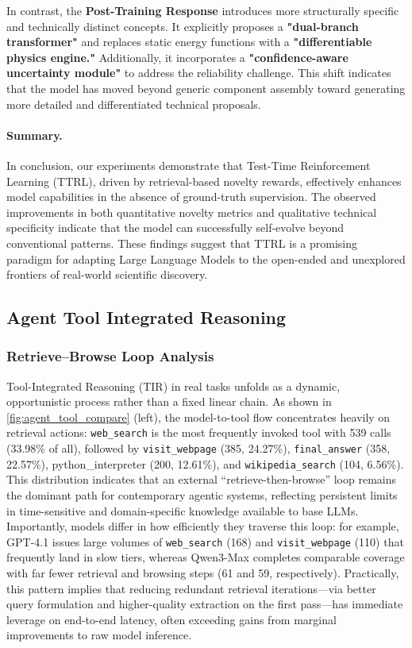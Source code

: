 In contrast, the \textbf{Post-Training Response} introduces more structurally specific and technically distinct concepts. It explicitly proposes a \textbf{"dual-branch transformer"} and replaces static energy functions with a \textbf{"differentiable physics engine."} Additionally, it incorporates a \textbf{"confidence-aware uncertainty module"} to address the reliability challenge. This shift indicates that the model has moved beyond generic component assembly toward generating more detailed and differentiated technical proposals.

\paragraph{Summary.}
In conclusion, our experiments demonstrate that Test-Time Reinforcement Learning (TTRL), driven by retrieval-based novelty rewards, effectively enhances model capabilities in the absence of ground-truth supervision. The observed improvements in both quantitative novelty metrics and qualitative technical specificity indicate that the model can successfully self-evolve beyond conventional patterns. These findings suggest that TTRL is a promising paradigm for adapting Large Language Models to the open-ended and unexplored frontiers of real-world scientific discovery.

\subsection{Agent Tool Integrated Reasoning}

\subsubsection{Retrieve–Browse Loop Analysis}
Tool-Integrated Reasoning (TIR) in real tasks unfolds as a dynamic, opportunistic process rather than a fixed linear chain\cite{paranjape2023artautomaticmultistepreasoning}. As shown in \autoref{fig:agent_tool_compare} (left), the model-to-tool flow concentrates heavily on retrieval actions: \texttt{web\_search} is the most frequently invoked tool with 539 calls (33.98\% of all), followed by \texttt{visit\_webpage} (385, 24.27\%), \texttt{final\_answer} (358, 22.57\%), python\_interpreter (200, 12.61\%), and \texttt{wikipedia\_search} (104, 6.56\%). This distribution indicates that an external “retrieve-then-browse” loop remains the dominant path for contemporary agentic systems, reflecting persistent limits in time-sensitive and domain-specific knowledge available to base LLMs. Importantly, models differ in how efficiently they traverse this loop: for example, GPT-4.1 issues large volumes of \texttt{web\_search} (168) and \texttt{visit\_webpage} (110) that frequently land in slow tiers, whereas Qwen3-Max completes comparable coverage with far fewer retrieval and browsing steps (61 and 59, respectively). Practically, this pattern implies that reducing redundant retrieval iterations—via better query formulation and higher-quality extraction on the first pass—has immediate leverage on end-to-end latency, often exceeding gains from marginal improvements to raw model inference.

